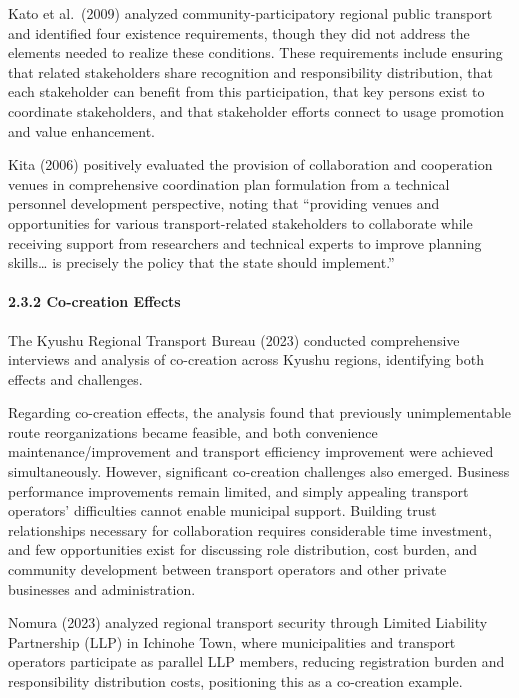 Kato et al.~(2009) analyzed community-participatory regional public transport and identified four existence requirements, though they did not address the elements needed to realize these conditions. These requirements include ensuring that related stakeholders share recognition and responsibility distribution, that each stakeholder can benefit from this participation, that key persons exist to coordinate stakeholders, and that stakeholder efforts connect to usage promotion and value enhancement.

Kita (2006) positively evaluated the provision of collaboration and cooperation venues in comprehensive coordination plan formulation from a technical personnel development perspective, noting that ``providing venues and opportunities for various transport-related stakeholders to collaborate while receiving support from researchers and technical experts to improve planning skills\ldots{} is precisely the policy that the state should implement.''

\paragraph{2.3.2 Co-creation Effects}\label{co-creation-effects}

The Kyushu Regional Transport Bureau (2023) conducted comprehensive interviews and analysis of co-creation across Kyushu regions, identifying both effects and challenges.

Regarding co-creation effects, the analysis found that previously unimplementable route reorganizations became feasible, and both convenience maintenance/improvement and transport efficiency improvement were achieved simultaneously. However, significant co-creation challenges also emerged. Business performance improvements remain limited, and simply appealing transport operators' difficulties cannot enable municipal support. Building trust relationships necessary for collaboration requires considerable time investment, and few opportunities exist for discussing role distribution, cost burden, and community development between transport operators and other private businesses and administration.

Nomura (2023) analyzed regional transport security through Limited Liability Partnership (LLP) in Ichinohe Town, where municipalities and transport operators participate as parallel LLP members, reducing registration burden and responsibility distribution costs, positioning this as a co-creation example.


